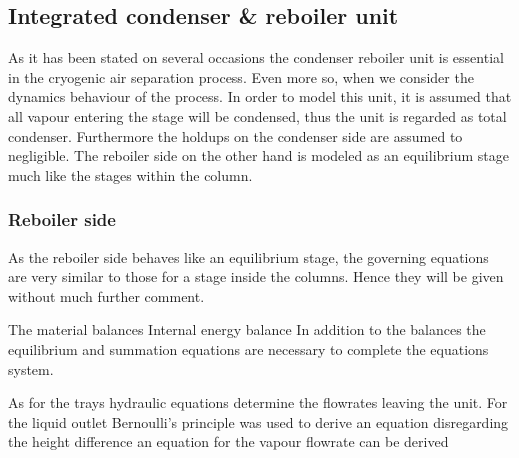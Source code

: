     \subsection{Integrated condenser \& reboiler unit}

    As it has been stated on several occasions the condenser reboiler unit is essential in the cryogenic air separation process.
    Even more so, when we consider the dynamics behaviour of the process. In order to model this unit, it is assumed that
    all vapour entering the stage will be condensed, thus the unit is regarded as total condenser. Furthermore the holdups on the
    condenser side are assumed to negligible. The reboiler side on the other hand is modeled as an equilibrium stage much like
    the stages within the column.

    \subsubsection{Reboiler side}
        As the reboiler side behaves like an equilibrium stage, the governing equations are very similar to those for
        a stage inside the columns. Hence they will be given without much further comment.

        The material balances
        Internal energy balance
        In addition to the balances the equilibrium and summation equations are necessary to complete
        the equations system.

        As for the trays hydraulic equations determine the flowrates leaving the unit. For the liquid
        outlet Bernoulli's principle was used to derive an equation
        disregarding the height difference an equation for the vapour flowrate can be derived

